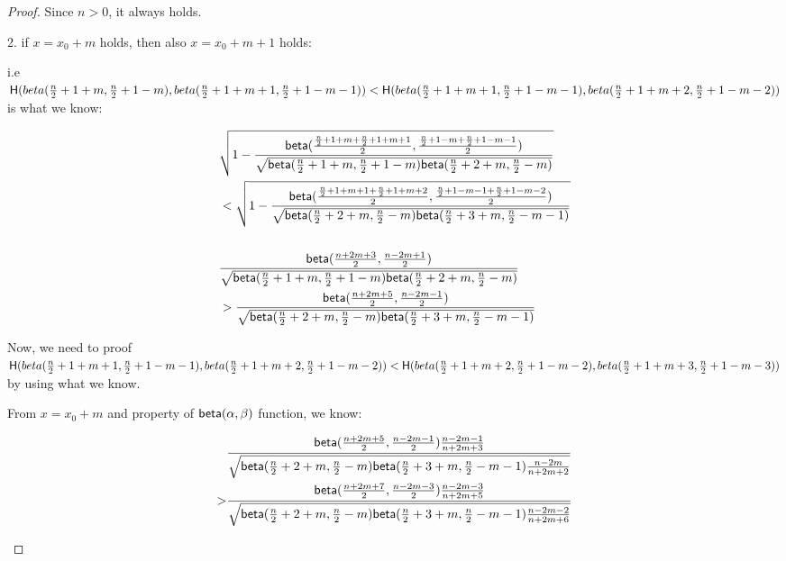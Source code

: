 \documentclass{article}
\begin{document}
\begin{proof}
Since $n > 0$, it always holds.

2. if $x = x_0 + m$ holds, then also $x = x_0 + m + 1$ holds:

i.e $\mathsf{H}(beta(\frac{n}{2} + 1 + m, \frac{n}{2} + 1 - m), beta(\frac{n}{2} + 1 + m + 1, \frac{n}{2} + 1 - m - 1)) 
< \mathsf{H}(beta(\frac{n}{2} + 1 + m + 1, \frac{n}{2} + 1 - m - 1), beta(\frac{n}{2} + 1 + m + 2, \frac{n}{2} + 1 - m - 2))$
is what we know:

\begin{small}
\begin{equation*}
\begin{split}
& \sqrt{
1 - \frac{\mathsf{beta}(
\frac{\frac{n}{2} + 1 + m + \frac{n}{2} + 1 + m + 1}{2},
\frac{\frac{n}{2} + 1 - m + \frac{n}{2} + 1 - m - 1}{2})}
{\sqrt{
\mathsf{beta}(\frac{n}{2} + 1 + m, \frac{n}{2} + 1 - m)
\mathsf{beta}(\frac{n}{2} + 2 + m, \frac{n}{2} - m)
}
}
}\\
& < \sqrt{
1 - \frac{\mathsf{beta}(
\frac{\frac{n}{2} + 1 + m + 1 + \frac{n}{2} + 1 + m + 2}{2},
\frac{\frac{n}{2} + 1 - m - 1 + \frac{n}{2} + 1 - m - 2}{2})}
{\sqrt{
\mathsf{beta}(\frac{n}{2} + 2 + m, \frac{n}{2} - m)
\mathsf{beta}(\frac{n}{2} + 3 + m, \frac{n}{2} - m - 1)
}
}
}\\
\\
& \frac{\mathsf{beta}(\frac{n + 2m + 3}{2}, \frac{n - 2m + 1}{2})}
{\sqrt{
\mathsf{beta}(\frac{n}{2} + 1 + m, \frac{n}{2} + 1 - m)
\mathsf{beta}(\frac{n}{2} + 2 + m, \frac{n}{2} - m)
}
}\\
& > \frac{\mathsf{beta}(\frac{n + 2m + 5}{2}, \frac{n - 2m - 1}{2})}
{\sqrt{
\mathsf{beta}(\frac{n}{2} + 2 + m, \frac{n}{2} - m)
\mathsf{beta}(\frac{n}{2} + 3 + m, \frac{n}{2} - m - 1)
}
}
\end{split}
\end{equation*}
\end{small}

Now, we need to proof $\mathsf{H}(beta(\frac{n}{2} + 1 + m + 1, \frac{n}{2} + 1 - m - 1), beta(\frac{n}{2} + 1 + m + 2, \frac{n}{2} + 1 - m - 2)) 
< \mathsf{H}(beta(\frac{n}{2} + 1 + m + 2, \frac{n}{2} + 1 - m - 2), beta(\frac{n}{2} + 1 + m + 3, \frac{n}{2} + 1 - m - 3))$ by using what we know.


From $x = x_0 + m$ and property of $\mathsf{beta}(\alpha, \beta)$ function, we know:
\vspace*{9.5cm}

\begin{footnotesize}
\begin{equation*}
\begin{split}
& \frac{\mathsf{beta}(\frac{n + 2m + 5}{2}, \frac{n - 2m - 1}{2})
\frac{n - 2m - 1}{n + 2m + 3}}
{\sqrt{
\mathsf{beta}(\frac{n}{2} + 2 + m, \frac{n}{2} - m)
\mathsf{beta}(\frac{n}{2} + 3 + m, \frac{n}{2} - m - 1)
\frac{n - 2m}{n + 2m + 2}
}
}\\
> & \frac{\mathsf{beta}(\frac{n + 2m + 7}{2}, \frac{n - 2m - 3}{2})
\frac{n - 2m - 3}{n + 2m + 5}}
{\sqrt{
\mathsf{beta}(\frac{n}{2} + 2 + m, \frac{n}{2} - m)
\mathsf{beta}(\frac{n}{2} + 3 + m, \frac{n}{2} - m - 1)
\frac{n - 2m - 2}{n + 2m + 6}
}
}\\
\end{split}
\end{equation*}


\end{footnotesize}
\end{proof}
\end{document}
